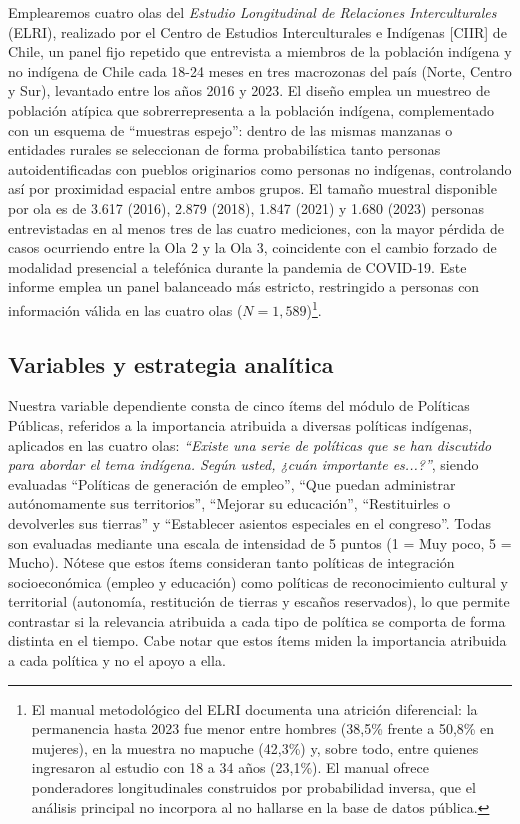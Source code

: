 \documentclass{article}
\begin{document}
Emplearemos cuatro olas del \textit{Estudio Longitudinal de Relaciones Interculturales} (ELRI), realizado por el Centro de Estudios Interculturales e Indígenas [CIIR] de Chile, un panel fijo repetido que entrevista a miembros de la población indígena y no indígena de Chile cada 18-24 meses en tres macrozonas del país (Norte, Centro y Sur), levantado entre los años 2016 y 2023. El diseño emplea un muestreo de población atípica que sobrerrepresenta a la población indígena, complementado con un esquema de ``muestras espejo'': dentro de las mismas manzanas o entidades rurales se seleccionan de forma probabilística tanto personas autoidentificadas con pueblos originarios como personas no indígenas, controlando así por proximidad espacial entre ambos grupos. El tamaño muestral disponible por ola es de 3.617 (2016), 2.879 (2018), 1.847 (2021) y 1.680 (2023) personas entrevistadas en al menos tres de las cuatro mediciones, con la mayor pérdida de casos ocurriendo entre la Ola 2 y la Ola 3, coincidente con el cambio forzado de modalidad presencial a telefónica durante la pandemia de COVID-19. Este informe emplea un panel balanceado más estricto, restringido a personas con información válida en las cuatro olas ($N=1{,}589$)\footnote{El manual metodológico del ELRI documenta una atrición diferencial: la permanencia hasta 2023 fue menor entre hombres (38,5\% frente a 50,8\% en mujeres), en la muestra no mapuche (42,3\%) y, sobre todo, entre quienes ingresaron al estudio con 18 a 34 años (23,1\%). El manual ofrece ponderadores longitudinales construidos por probabilidad inversa, que el análisis principal no incorpora al no hallarse en la base de datos pública.}.



\subsection{Variables y estrategia analítica}

Nuestra variable dependiente consta de cinco ítems del módulo de Políticas Públicas, referidos a la importancia atribuida a diversas políticas indígenas, aplicados en las cuatro olas: \textit{``Existe una serie de políticas que se han discutido para abordar el tema indígena. Según usted, ¿cuán importante es...?''}, siendo evaluadas ``Políticas de generación de empleo'', ``Que puedan administrar autónomamente sus territorios'', ``Mejorar su educación'', ``Restituirles o devolverles sus tierras'' y ``Establecer asientos especiales en el congreso''. Todas son evaluadas mediante una escala de intensidad de 5 puntos (1 = Muy poco, 5 = Mucho). Nótese que estos ítems consideran tanto políticas de integración socioeconómica (empleo y educación) como políticas de reconocimiento cultural y territorial (autonomía, restitución de tierras y escaños reservados), lo que permite contrastar si la relevancia atribuida a cada tipo de política se comporta de forma distinta en el tiempo. Cabe notar que estos ítems miden la importancia atribuida a cada política y no el apoyo a ella.
\end{document}
